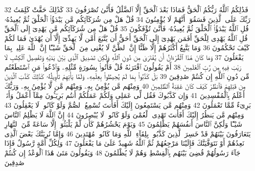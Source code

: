 {\tiny\colorbox{cl_aya}{32}} فَذَٰلِكُمُ ٱللَّهُ رَبُّكُمُ ٱلْحَقُّ فَمَاذَا بَعْدَ ٱلْحَقِّ إِلَّا ٱلضَّلَٰلُ فَأَنَّىٰ تُصْرَفُونَ
{\tiny\colorbox{cl_aya}{33}} كَذَٰلِكَ حَقَّتْ كَلِمَتُ رَبِّكَ عَلَى ٱلَّذِينَ فَسَقُوٓا۟ أَنَّهُمْ لَا يُؤْمِنُونَ
{\tiny\colorbox{cl_aya}{34}} قُلْ هَلْ مِن شُرَكَآئِكُم مَّن يَبْدَؤُا۟ ٱلْخَلْقَ ثُمَّ يُعِيدُهُۥ قُلِ ٱللَّهُ يَبْدَؤُا۟ ٱلْخَلْقَ ثُمَّ يُعِيدُهُۥ فَأَنَّىٰ تُؤْفَكُونَ
{\tiny\colorbox{cl_aya}{35}} قُلْ هَلْ مِن شُرَكَآئِكُم مَّن يَهْدِىٓ إِلَى ٱلْحَقِّ قُلِ ٱللَّهُ يَهْدِى لِلْحَقِّ أَفَمَن يَهْدِىٓ إِلَى ٱلْحَقِّ أَحَقُّ أَن يُتَّبَعَ أَمَّن لَّا يَهِدِّىٓ إِلَّآ أَن يُهْدَىٰ فَمَا لَكُمْ كَيْفَ تَحْكُمُونَ
{\tiny\colorbox{cl_aya}{36}} وَمَا يَتَّبِعُ أَكْثَرُهُمْ إِلَّا ظَنًّا إِنَّ ٱلظَّنَّ لَا يُغْنِى مِنَ ٱلْحَقِّ شَيْـًٔا إِنَّ ٱللَّهَ عَلِيمٌۢ بِمَا يَفْعَلُونَ
{\tiny\colorbox{cl_aya}{37}} وَمَا كَانَ هَٰذَا ٱلْقُرْءَانُ أَن يُفْتَرَىٰ مِن دُونِ ٱللَّهِ وَلَٰكِن تَصْدِيقَ ٱلَّذِى بَيْنَ يَدَيْهِ وَتَفْصِيلَ ٱلْكِتَٰبِ لَا رَيْبَ فِيهِ مِن رَّبِّ ٱلْعَٰلَمِينَ
{\tiny\colorbox{cl_aya}{38}} أَمْ يَقُولُونَ ٱفْتَرَىٰهُ قُلْ فَأْتُوا۟ بِسُورَةٍ مِّثْلِهِۦ وَٱدْعُوا۟ مَنِ ٱسْتَطَعْتُم مِّن دُونِ ٱللَّهِ إِن كُنتُمْ صَٰدِقِينَ
{\tiny\colorbox{cl_aya}{39}} بَلْ كَذَّبُوا۟ بِمَا لَمْ يُحِيطُوا۟ بِعِلْمِهِۦ وَلَمَّا يَأْتِهِمْ تَأْوِيلُهُۥ كَذَٰلِكَ كَذَّبَ ٱلَّذِينَ مِن قَبْلِهِمْ فَٱنظُرْ كَيْفَ كَانَ عَٰقِبَةُ ٱلظَّٰلِمِينَ
{\tiny\colorbox{cl_aya}{40}} وَمِنْهُم مَّن يُؤْمِنُ بِهِۦ وَمِنْهُم مَّن لَّا يُؤْمِنُ بِهِۦ وَرَبُّكَ أَعْلَمُ بِٱلْمُفْسِدِينَ
{\tiny\colorbox{cl_aya}{41}} وَإِن كَذَّبُوكَ فَقُل لِّى عَمَلِى وَلَكُمْ عَمَلُكُمْ أَنتُم بَرِيٓـُٔونَ مِمَّآ أَعْمَلُ وَأَنَا۠ بَرِىٓءٌ مِّمَّا تَعْمَلُونَ
{\tiny\colorbox{cl_aya}{42}} وَمِنْهُم مَّن يَسْتَمِعُونَ إِلَيْكَ أَفَأَنتَ تُسْمِعُ ٱلصُّمَّ وَلَوْ كَانُوا۟ لَا يَعْقِلُونَ
{\tiny\colorbox{cl_aya}{43}} وَمِنْهُم مَّن يَنظُرُ إِلَيْكَ أَفَأَنتَ تَهْدِى ٱلْعُمْىَ وَلَوْ كَانُوا۟ لَا يُبْصِرُونَ
{\tiny\colorbox{cl_aya}{44}} إِنَّ ٱللَّهَ لَا يَظْلِمُ ٱلنَّاسَ شَيْـًٔا وَلَٰكِنَّ ٱلنَّاسَ أَنفُسَهُمْ يَظْلِمُونَ
{\tiny\colorbox{cl_aya}{45}} وَيَوْمَ يَحْشُرُهُمْ كَأَن لَّمْ يَلْبَثُوٓا۟ إِلَّا سَاعَةً مِّنَ ٱلنَّهَارِ يَتَعَارَفُونَ بَيْنَهُمْ قَدْ خَسِرَ ٱلَّذِينَ كَذَّبُوا۟ بِلِقَآءِ ٱللَّهِ وَمَا كَانُوا۟ مُهْتَدِينَ
{\tiny\colorbox{cl_aya}{46}} وَإِمَّا نُرِيَنَّكَ بَعْضَ ٱلَّذِى نَعِدُهُمْ أَوْ نَتَوَفَّيَنَّكَ فَإِلَيْنَا مَرْجِعُهُمْ ثُمَّ ٱللَّهُ شَهِيدٌ عَلَىٰ مَا يَفْعَلُونَ
{\tiny\colorbox{cl_aya}{47}} وَلِكُلِّ أُمَّةٍ رَّسُولٌ فَإِذَا جَآءَ رَسُولُهُمْ قُضِىَ بَيْنَهُم بِٱلْقِسْطِ وَهُمْ لَا يُظْلَمُونَ
{\tiny\colorbox{cl_aya}{48}} وَيَقُولُونَ مَتَىٰ هَٰذَا ٱلْوَعْدُ إِن كُنتُمْ صَٰدِقِينَ
